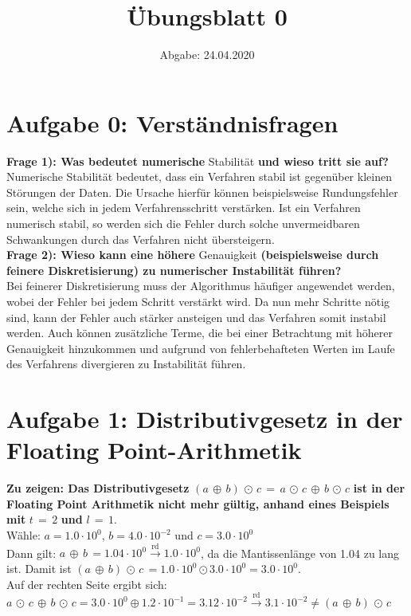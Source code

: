 

\subject{Computational Physics}
\title{Übungsblatt 0}
\date{%
  Abgabe: 24.04.2020
}



\maketitle
\thispagestyle{empty}
\newpage

\section*{Aufgabe 0: Verständnisfragen}

\textbf{Frage 1): Was bedeutet numerische} Stabilität \textbf{und wieso tritt sie auf?}\\
Numerische Stabilität bedeutet, dass ein Verfahren stabil ist gegenüber kleinen Störungen der Daten. Die Ursache hierfür können beispielsweise Rundungsfehler sein, welche sich in jedem Verfahrensschritt verstärken. Ist ein Verfahren numerisch stabil, so werden sich die Fehler durch solche unvermeidbaren
Schwankungen durch das Verfahren nicht übersteigern. \\
\textbf{Frage 2): Wieso kann eine höhere} Genauigkeit \textbf{(beispielsweise durch feinere Diskretisierung) zu numerischer Instabilität führen?}\\
Bei feinerer Diskretisierung muss der Algorithmus häufiger angewendet werden, wobei der Fehler bei jedem Schritt verstärkt wird. Da nun mehr Schritte nötig sind, kann der Fehler auch stärker ansteigen und das Verfahren somit instabil werden. Auch können zusätzliche Terme, die bei einer Betrachtung mit höherer Genauigkeit hinzukommen und aufgrund von fehlerbehafteten Werten im Laufe des Verfahrens divergieren zu Instabilität führen.


\section*{Aufgabe 1: Distributivgesetz in der Floating Point-Arithmetik}
\textbf{Zu zeigen: Das Distributivgesetz }$(a\,\oplus\,b)\,\odot\,c\,=\,a\,\odot\,c\,\oplus\,b\,\odot\,c$\textbf{ ist in der Floating Point Arithmetik nicht mehr gültig, anhand eines Beispiels mit }$t\,=\,2$\textbf{ und }$l\,=\,1$.\\
Wähle: $a=1.0\cdot10^0$, $b=4.0\cdot10^{-2}$ und $c=3.0\cdot10^{0}$ \\
Dann gilt: $a\,\oplus\,b\,=1.04\cdot10^0\overset{\text{rd}}{\to}1.0\cdot10^0$, da die Mantissenlänge von 1.04 zu lang ist.
Damit ist $(a\,\oplus\,b)\,\odot\,c\,=1.0\cdot10^0\odot3.0\cdot10^0=3.0\cdot10^0$.\\
Auf der rechten Seite ergibt sich:\\$a\,\odot\,c\,\oplus\,b\,\odot\,c=3.0\cdot10^0\oplus1.2\cdot
10^{-1}=3.12\cdot10^{-2}\overset{\text{rd}}{\to}3.1\cdot10^{-2}\neq(a\,\oplus\,b)\,\odot\,c$

